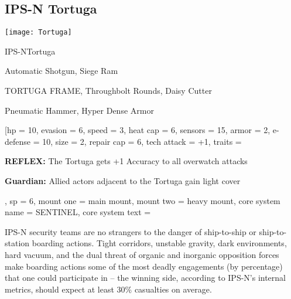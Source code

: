\subsection{IPS-N Tortuga}

\begin{center}
    \texttt{[image: Tortuga]}
\end{center}

\begin{mech}{IPS-N}{Tortuga}


\begin{license}
\item Automatic Shotgun, Siege Ram
\item TORTUGA FRAME, Throughbolt Rounds, Daisy Cutter
\item Pneumatic Hammer, Hyper Dense Armor
\end{license}

\frameBox
[hp = 10,
evasion = 6,
speed = 3,
heat cap = 6,
sensors = 15,
armor = 2,
e-defense = 10,
size = 2,
repair cap = 6,
tech attack = +1,
traits = {\textbf{REFLEX:} The Tortuga gets +1 Accuracy to all overwatch attacks

\textbf{Guardian:} Allied actors adjacent to the Tortuga gain light cover },
sp = 6,
mount one = main mount,
mount two = heavy mount,
core system name = SENTINEL,
core system text = {IPS-N security teams are no strangers to the danger of ship-to-ship or ship-to-station boarding actions. Tight corridors, unstable gravity, dark environments, hard vacuum, and the dual threat of organic and inorganic opposition forces make boarding actions some of the most deadly engagements (by percentage) that one could participate in -- the winning side, according to IPS-N's internal metrics, should expect at least 30\% casualties on average.

}
\end{mech}
